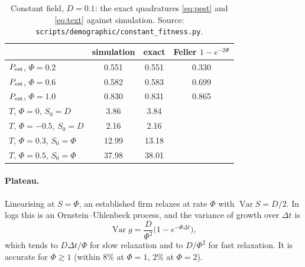 \documentclass[pre,twocolumn,superscriptaddress,nofootinbib]{revtex4-2}
\newcommand{\Var}{\operatorname{Var}}
\begin{document}
\begin{table}[b]
\caption{Constant field, $D=0.1$: the exact quadratures \eqref{eq:pest} and \eqref{eq:text} against simulation.  Source:
\texttt{scripts/demographic/constant\_fitness.py}.}
\label{tab:constant}
\begin{ruledtabular}
\begin{tabular}{lccc}
 & simulation & exact & Feller $1-e^{-2\Phi}$\\
\hline
$P_{\rm est}$, $\Phi=0.2$ & 0.551 & 0.551 & 0.330\\
$P_{\rm est}$, $\Phi=0.6$ & 0.582 & 0.583 & 0.699\\
$P_{\rm est}$, $\Phi=1.0$ & 0.830 & 0.831 & 0.865\\
$T$, $\Phi=0$, $S_0=D$ & 3.86 & 3.84 & \\
$T$, $\Phi=-0.5$, $S_0=D$ & 2.16 & 2.16 & \\
$T$, $\Phi=0.3$, $S_0=\Phi$ & 12.99 & 13.18 & \\
$T$, $\Phi=0.5$, $S_0=\Phi$ & 37.98 & 38.01 & \\
\end{tabular}
\end{ruledtabular}
\end{table}

\paragraph{Plateau.}  Linearising at $S=\Phi$, an established firm relaxes at rate $\Phi$ with
$\Var S=D/2$.  In logs this is an Ornstein--Uhlenbeck process, and the variance of growth over
$\Delta t$ is
\begin{equation}
\Var g=\frac{D}{\Phi^2}\big(1-e^{-\Phi\Delta t}\big),
\label{eq:plateau}
\end{equation}
which tends to $D\Delta t/\Phi$ for slow relaxation and to $D/\Phi^2$ for fast relaxation.  It is
accurate for $\Phi\gtrsim1$ (within $8\%$ at $\Phi=1$, $2\%$ at $\Phi=2$).
\end{document}
